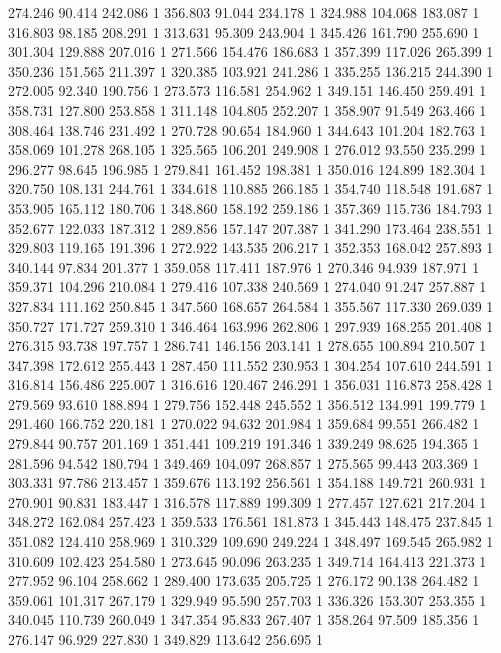 	274.246	90.414	242.086	1
	356.803	91.044	234.178	1
	324.988	104.068	183.087	1
	316.803	98.185	208.291	1
	313.631	95.309	243.904	1
	345.426	161.790	255.690	1
	301.304	129.888	207.016	1
	271.566	154.476	186.683	1
	357.399	117.026	265.399	1
	350.236	151.565	211.397	1
	320.385	103.921	241.286	1
	335.255	136.215	244.390	1
	272.005	92.340	190.756	1
	273.573	116.581	254.962	1
	349.151	146.450	259.491	1
	358.731	127.800	253.858	1
	311.148	104.805	252.207	1
	358.907	91.549	263.466	1
	308.464	138.746	231.492	1
	270.728	90.654	184.960	1
	344.643	101.204	182.763	1
	358.069	101.278	268.105	1
	325.565	106.201	249.908	1
	276.012	93.550	235.299	1
	296.277	98.645	196.985	1
	279.841	161.452	198.381	1
	350.016	124.899	182.304	1
	320.750	108.131	244.761	1
	334.618	110.885	266.185	1
	354.740	118.548	191.687	1
	353.905	165.112	180.706	1
	348.860	158.192	259.186	1
	357.369	115.736	184.793	1
	352.677	122.033	187.312	1
	289.856	157.147	207.387	1
	341.290	173.464	238.551	1
	329.803	119.165	191.396	1
	272.922	143.535	206.217	1
	352.353	168.042	257.893	1
	340.144	97.834	201.377	1
	359.058	117.411	187.976	1
	270.346	94.939	187.971	1
	359.371	104.296	210.084	1
	279.416	107.338	240.569	1
	274.040	91.247	257.887	1
	327.834	111.162	250.845	1
	347.560	168.657	264.584	1
	355.567	117.330	269.039	1
	350.727	171.727	259.310	1
	346.464	163.996	262.806	1
	297.939	168.255	201.408	1
	276.315	93.738	197.757	1
	286.741	146.156	203.141	1
	278.655	100.894	210.507	1
	347.398	172.612	255.443	1
	287.450	111.552	230.953	1
	304.254	107.610	244.591	1
	316.814	156.486	225.007	1
	316.616	120.467	246.291	1
	356.031	116.873	258.428	1
	279.569	93.610	188.894	1
	279.756	152.448	245.552	1
	356.512	134.991	199.779	1
	291.460	166.752	220.181	1
	270.022	94.632	201.984	1
	359.684	99.551	266.482	1
	279.844	90.757	201.169	1
	351.441	109.219	191.346	1
	339.249	98.625	194.365	1
	281.596	94.542	180.794	1
	349.469	104.097	268.857	1
	275.565	99.443	203.369	1
	303.331	97.786	213.457	1
	359.676	113.192	256.561	1
	354.188	149.721	260.931	1
	270.901	90.831	183.447	1
	316.578	117.889	199.309	1
	277.457	127.621	217.204	1
	348.272	162.084	257.423	1
	359.533	176.561	181.873	1
	345.443	148.475	237.845	1
	351.082	124.410	258.969	1
	310.329	109.690	249.224	1
	348.497	169.545	265.982	1
	310.609	102.423	254.580	1
	273.645	90.096	263.235	1
	349.714	164.413	221.373	1
	277.952	96.104	258.662	1
	289.400	173.635	205.725	1
	276.172	90.138	264.482	1
	359.061	101.317	267.179	1
	329.949	95.590	257.703	1
	336.326	153.307	253.355	1
	340.045	110.739	260.049	1
	347.354	95.833	267.407	1
	358.264	97.509	185.356	1
	276.147	96.929	227.830	1
	349.829	113.642	256.695	1
